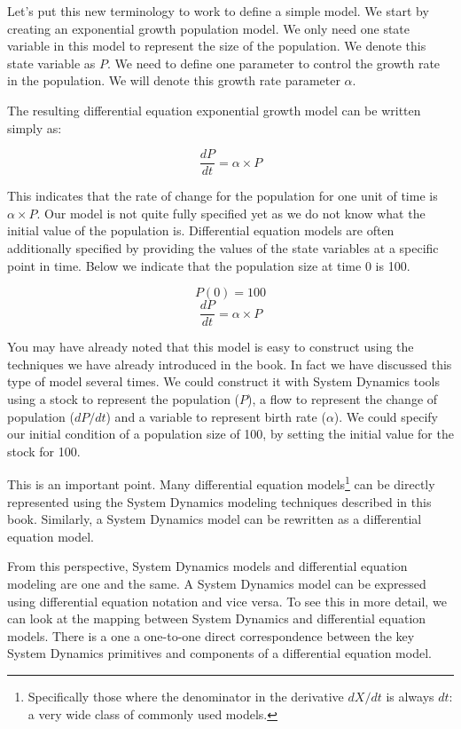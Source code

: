 \documentclass[]{memoir}
\begin{document}
Let's put this new terminology to work to define a simple model. We
start by creating an exponential growth population model. We only need
one state variable in this model to represent the size of the
population. We denote this state variable as $P$. We need to define one
parameter to control the growth rate in the population. We will denote
this growth rate parameter $\alpha$.

The resulting differential equation exponential growth model can be
written simply as:

\[ \frac{dP}{dt} = \alpha \times P \]

This indicates that the rate of change for the population for one unit
of time is $\alpha \times P$. Our model is not quite fully specified yet
as we do not know what the initial value of the population is.
Differential equation models are often additionally specified by
providing the values of the state variables at a specific point in time.
Below we indicate that the population size at time 0 is 100.

\[ P(0) = 100 \] \[ \frac{dP}{dt} = \alpha \times P \]

You may have already noted that this model is easy to construct using
the techniques we have already introduced in the book. In fact we have
discussed this type of model several times. We could construct it with
System Dynamics tools using a stock to represent the population ($P$), a
flow to represent the change of population ($dP/dt$) and a variable to
represent birth rate ($\alpha$). We could specify our initial condition
of a population size of 100, by setting the initial value for the stock
for 100.

This is an important point. Many differential equation models\footnote{Specifically
  those where the denominator in the derivative $dX/dt$ is always $dt$:
  a very wide class of commonly used models.} can be directly
represented using the System Dynamics modeling techniques described in
this book. Similarly, a System Dynamics model can be rewritten as a
differential equation model.

From this perspective, System Dynamics models and differential equation
modeling are one and the same. A System Dynamics model can be expressed
using differential equation notation and vice versa. To see this in more
detail, we can look at the mapping between System Dynamics and
differential equation models. There is a one a one-to-one direct
correspondence between the key System Dynamics primitives and components
of a differential equation model.
\end{document}
